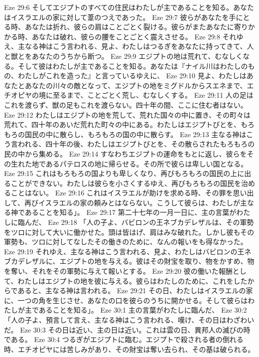 Eze 29:6  そしてエジプトのすべての住民はわたしが主であることを知る。あなたはイスラエルの家に対して葦のつえであった。
Eze 29:7  彼らがあなたを手にとる時、あなたは折れ、彼らの肩はことごとく裂ける。彼らがまたあなたに寄りかかる時、あなたは破れ、彼らの腰をことごとく震えさせる。
Eze 29:8  それゆえ、主なる神はこう言われる、見よ、わたしはつるぎをあなたに持ってきて、人と獣とをあなたのうちから断つ。
Eze 29:9  エジプトの地は荒れて、むなしくなる。そして彼はわたしが主であることを知る。あなたは『ナイル川はわたしのもの、わたしがこれを造った』と言っているゆえに、
Eze 29:10  見よ、わたしはあなたとあなたの川々の敵となって、エジプトの地をミグドルからスエネまで、エチオピヤの境に至るまで、ことごとく荒し、むなしくする。
Eze 29:11  人の足はこれを渡らず、獣の足もこれを渡らない。四十年の間、ここに住む者はない。
Eze 29:12  わたしはエジプトの地を荒して、荒れた国々の中に置き、その町々は荒れて、四十年のあいだ荒れた町々の中にある。わたしはエジプトびとを、もろもろの国民の中に散らし、もろもろの国の中に散らす。
Eze 29:13  主なる神はこう言われる、四十年の後、わたしはエジプトびとを、その散らされたもろもろの民の中から集める。
Eze 29:14  すなわちエジプトの運命をもとに返し、彼らをその生れた地であるパテロスの地に帰らせる。その所で彼らは卑しい国となる。
Eze 29:15  これはもろもろの国よりも卑しくなり、再びもろもろの国民の上に出ることができない。わたしは彼らを小さくするゆえ、再びもろもろの国民を治めることはない。
Eze 29:16  これはイスラエルが助けを求める時、その罪を思い出して、再びイスラエルの家の頼みとはならない。こうして彼らは、わたしが主なる神であることを知る」。
Eze 29:17  第二十七年の一月一日に、主の言葉がわたしに臨んだ、
Eze 29:18  「人の子よ、バビロンの王ネブカデレザルは、その軍勢をツロに対して大いに働かせた。頭は皆はげ、肩はみな破れた。しかし彼もその軍勢も、ツロに対してなしたその働きのために、なんの報いをも得なかった。
Eze 29:19  それゆえ、主なる神はこう言われる、見よ、わたしはバビロンの王ネブカデレザルに、エジプトの地を与える。彼はその財宝を取り、物をかすめ、物を奪い、それをその軍勢に与えて報いとする。
Eze 29:20  彼の働いた報酬として、わたしはエジプトの地を彼に与える。彼らはわたしのために、これをしたからであると、主なる神は言われる。
Eze 29:21  その日、わたしはイスラエルの家に、一つの角を生じさせ、あなたの口を彼らのうちに開かせる。そして彼らはわたしが主であることを知る」。
Eze 30:1  主の言葉がわたしに臨んだ、
Eze 30:2  「人の子よ、預言して言え、主なる神はこう言われる、嘆け、その日はわざわいだ。
Eze 30:3  その日は近い、主の日は近い。これは雲の日、異邦人の滅びの時である。
Eze 30:4  つるぎがエジプトに臨む。エジプトで殺される者の倒れる時、エチオピヤには苦しみがあり、その財宝は奪い去られ、その基は破られる。
